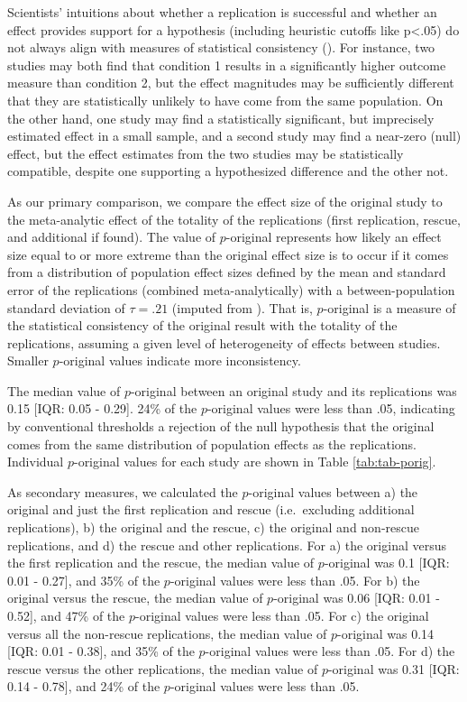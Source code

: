 \documentclass[
  english,
  a4paper,
]{article}
\begin{document}
Scientists' intuitions about whether a replication is successful and whether an effect provides support for a hypothesis (including heuristic cutoffs like p\textless.05) do not always align with measures of statistical consistency ().
For instance, two studies may both find that condition 1 results in a significantly higher outcome measure than condition 2, but the effect magnitudes may be sufficiently different that they are statistically unlikely to have come from the same population.
On the other hand, one study may find a statistically significant, but imprecisely estimated effect in a small sample, and a second study may find a near-zero (null) effect, but the effect estimates from the two studies may be statistically compatible, despite one supporting a hypothesized difference and the other not.

As our primary comparison, we compare the effect size of the original study to the meta-analytic effect of the totality of the replications (first replication, rescue, and additional if found).
The value of \(p\)-original represents how likely an effect size equal to or more extreme than the original effect size is to occur if it comes from a distribution of population effect sizes defined by the mean and standard error of the replications (combined meta-analytically) with a between-population standard deviation of \(\tau=.21\) (imputed from ).
That is, \(p\)-original is a measure of the statistical consistency of the original result with the totality of the replications, assuming a given level of heterogeneity of effects between studies.
Smaller \(p\)-original values indicate more inconsistency.

The median value of \(p\)-original between an original study and its replications was 0.15 {[}IQR: 0.05 - 0.29{]}.
24\% of the \(p\)-original values were less than .05, indicating by conventional thresholds a rejection of the null hypothesis that the original comes from the same distribution of population effects as the replications.
Individual \(p\)-original values for each study are shown in Table \ref{tab:tab-porig}.

As secondary measures, we calculated the \(p\)-original values between a) the original and just the first replication and rescue (i.e.~excluding additional replications), b) the original and the rescue, c) the original and non-rescue replications, and d) the rescue and other replications.
For a) the original versus the first replication and the rescue, the median value of \(p\)-original was 0.1 {[}IQR: 0.01 - 0.27{]}, and 35\% of the \(p\)-original values were less than .05.
For b) the original versus the rescue, the median value of \(p\)-original was 0.06 {[}IQR: 0.01 - 0.52{]}, and 47\% of the \(p\)-original values were less than .05.
For c) the original versus all the non-rescue replications, the median value of \(p\)-original was 0.14 {[}IQR: 0.01 - 0.38{]}, and 35\% of the \(p\)-original values were less than .05.
For d) the rescue versus the other replications, the median value of \(p\)-original was 0.31 {[}IQR: 0.14 - 0.78{]}, and 24\% of the \(p\)-original values were less than .05.
\end{document}
